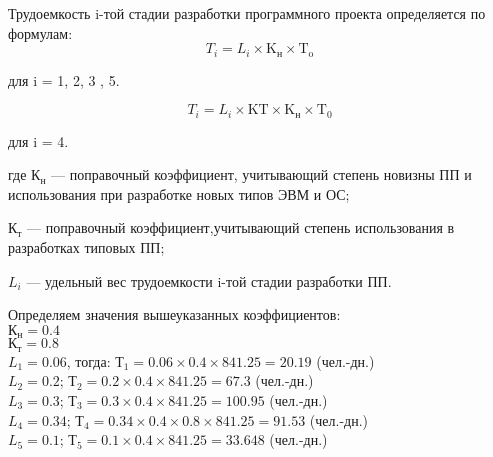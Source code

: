 \begin{par}
Трудоемкость i-той стадии разработки программного проекта определяется по формулам:
\begin{equation}
	T_i = L_i \times{} \textrm{K}_{\textrm{н}} \times{} \textrm{T}_{\textrm{o}}
\end{equation}
\begin{ESKDexplanation}
	\item[для ]{} i = 1, 2, 3 , 5.
\end{ESKDexplanation}

\begin{equation}T_i = L_i \times{} \textrm{KT} \times{} \textrm{K}_{\textrm{н}} \times{} \textrm{T}_0\end{equation}
\begin{ESKDexplanation}\item[для ]{} i = 4.\end{ESKDexplanation}

\begin{ESKDexplanation}
	\item[где ]{} $\textrm{К}_{\textrm{н}}$ --- поправочный коэффициент, учитывающий степень новизны ПП и
		использования при разработке новых типов ЭВМ и ОС;
	\item{} $\textrm{К}_{\textrm{т}}$ --- поправочный коэффициент,учитывающий степень использования в разработках типовых ПП;
	\item{} $L_i$ --- удельный вес трудоемкости i-той стадии разработки ПП.
\end{ESKDexplanation}
Определяем значения вышеуказанных коэффициентов: \\
$\textrm{К}_{\textrm{н}} = 0.4$ \\
$\textrm{К}_{\textrm{т}} = 0.8$ \\
$L_1 = 0.06$, тогда: $\textrm{Т}_1 = 0.06 \times{} 0.4 \times{} 841.25 = 20.19$ (чел.-дн.) \\
$L_2 = 0.2$; $\textrm{Т}_2 = 0.2 \times{} 0.4 \times{} 841.25 = 67.3$ (чел.-дн.) \\
$L_3 = 0.3$; $\textrm{Т}_3 = 0.3 \times{} 0.4 \times{} 841.25 = 100.95$ (чел.-дн.) \\
$L_4 = 0.34$; $\textrm{Т}_4 = 0.34 \times{} 0.4 \times{} 0.8 \times{} 841.25 = 91.53$ (чел.-дн.) \\
$L_5 = 0.1$; $\textrm{Т}_5 = 0.1 \times{} 0.4 \times{} 841.25 = 33.648$ (чел.-дн.)
\end{par}

